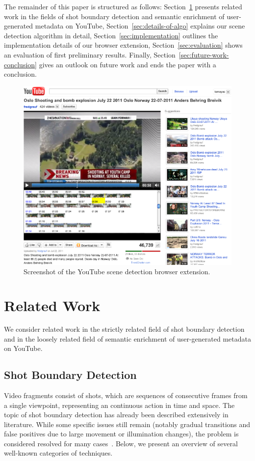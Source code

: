 \documentclass[10pt,twocolumn,letterpaper]{article}
\begin{document}
The remainder of this paper is structured as follows: Section~\ref{sec:related-work} presents related work in the fields of shot boundary detection and semantic enrichment of user-generated metadata on YouTube, Section~\ref{sec:details-of-algo} explains our scene detection algorithm in detail, Section~\ref{sec:implementation} outlines the implementation details of our browser extension, Section~\ref{sec:evaluation} shows an evaluation of first preliminary results. Finally, Section~\ref{sec:future-work-conclusion} gives an outlook on future work and ends the paper with a conclusion.

\begin{figure}
\begin{center}
   \includegraphics[width=0.8\linewidth]{./resources/screenshot.png}
\end{center}
   \caption{Screenshot of the YouTube scene detection browser extension.}
\label{fig:screenshot}
\end{figure}

\section{Related Work} \label{sec:related-work}
We consider related work in the strictly related field of shot boundary detection and in the loosely related field of semantic enrichment of user-generated metadata on YouTube.

\subsection{Shot Boundary Detection}
Video fragments consist of shots, which are sequences of consecutive frames from a single viewpoint, representing an continuous action in time and space. The topic of shot boundary detection has already been described extensively in literature. While some specific issues still remain (notably gradual transitions and false positives due to large movement or illumination changes), the problem is considered resolved for many cases~\cite{Hanjalic2002, Yuan2007}. Below, we present an overview of several well-known categories of techniques.
\end{document}
